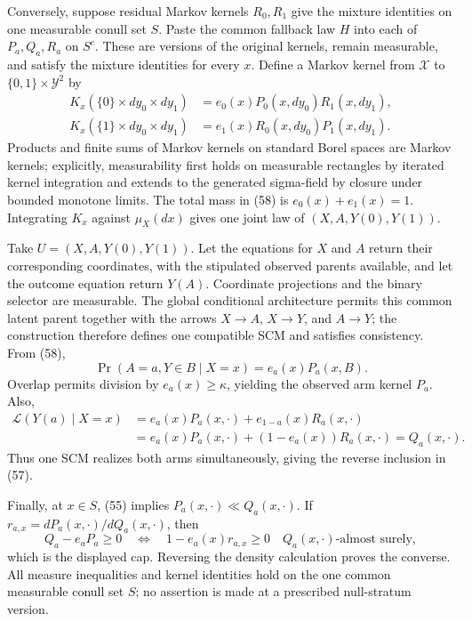 Conversely, suppose residual Markov kernels \(R_0,R_1\) give the mixture identities on one measurable conull set \(S\).  Paste the common fallback law \(H\) into each of \(P_a,Q_a,R_a\) on \(S^c\).  These are versions of the original kernels, remain measurable, and satisfy the mixture identities for every \(x\).  Define a Markov kernel from \(\mathcal X\) to \(\{0,1\}\times\mathcal Y^2\) by
\[
 \begin{aligned}
 K_x(\{0\}\times dy_0\times dy_1)
 &=e_0(x)P_0(x,dy_0)R_1(x,dy_1),\\
 K_x(\{1\}\times dy_0\times dy_1)
 &=e_1(x)R_0(x,dy_0)P_1(x,dy_1).
 \end{aligned} \tag{58}
\]
Products and finite sums of Markov kernels on standard Borel spaces are Markov kernels; explicitly, measurability first holds on measurable rectangles by iterated kernel integration and extends to the generated sigma-field by closure under bounded monotone limits.  The total mass in (58) is \(e_0(x)+e_1(x)=1\).  Integrating \(K_x\) against \(\mu_X(dx)\) gives one joint law of \((X,A,Y(0),Y(1))\).

Take \(U=(X,A,Y(0),Y(1))\).  Let the equations for \(X\) and \(A\) return their corresponding coordinates, with the stipulated observed parents available, and let the outcome equation return \(Y(A)\).  Coordinate projections and the binary selector are measurable.  The global conditional architecture permits this common latent parent together with the arrows \(X\to A\), \(X\to Y\), and \(A\to Y\); the construction therefore defines one compatible SCM and satisfies consistency.  From (58),
\[
 \Pr(A=a,Y\in B\mid X=x)=e_a(x)P_a(x,B).
\]
Overlap permits division by \(e_a(x)\ge\kappa\), yielding the observed arm kernel \(P_a\).  Also,
\[
 \begin{aligned}
 \mathcal L(Y(a)\mid X=x)
 &=e_a(x)P_a(x,\cdot)+e_{1-a}(x)R_a(x,\cdot)\\
 &=e_a(x)P_a(x,\cdot)+(1-e_a(x))R_a(x,\cdot)
 =Q_a(x,\cdot).
 \end{aligned} \tag{59}
\]
Thus one SCM realizes both arms simultaneously, giving the reverse inclusion in (57).

Finally, at \(x\in S\), (55) implies \(P_a(x,\cdot)\ll Q_a(x,\cdot)\).  If \(r_{a,x}=dP_a(x,\cdot)/dQ_a(x,\cdot)\), then
\[
 Q_a-e_aP_a\ge0
 \quad\Longleftrightarrow\quad
 1-e_a(x)r_{a,x}\ge0\quad Q_a(x,\cdot)\text{-almost surely},
\]
which is the displayed cap.  Reversing the density calculation proves the converse.  All measure inequalities and kernel identities hold on the one common measurable conull set \(S\); no assertion is made at a prescribed null-stratum version.